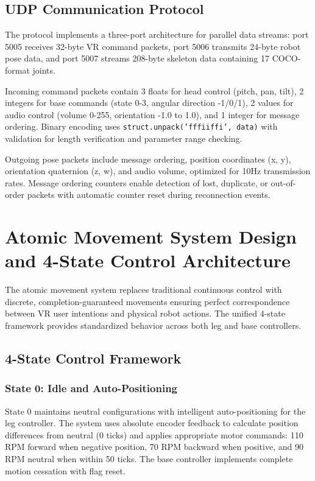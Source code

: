 \subsection{UDP Communication Protocol}

The protocol implements a three-port architecture for parallel data streams: port 5005 receives 32-byte VR command packets, port 5006 transmits 24-byte robot pose data, and port 5007 streams 208-byte skeleton data containing 17 COCO-format joints.

Incoming command packets contain 3 floats for head control (pitch, pan, tilt), 2 integers for base commands (state 0-3, angular direction -1/0/1), 2 values for audio control (volume 0-255, orientation -1.0 to 1.0), and 1 integer for message ordering. Binary encoding uses \texttt{struct.unpack('fffiiffi', data)} with validation for length verification and parameter range checking.

Outgoing pose packets include message ordering, position coordinates (x, y), orientation quaternion (z, w), and audio volume, optimized for 10Hz transmission rates. Message ordering counters enable detection of lost, duplicate, or out-of-order packets with automatic counter reset during reconnection events.

\section{Atomic Movement System Design and 4-State Control Architecture}

The atomic movement system replaces traditional continuous control with discrete, completion-guaranteed movements ensuring perfect correspondence between VR user intentions and physical robot actions. The unified 4-state framework provides standardized behavior across both leg and base controllers.

\subsection{4-State Control Framework}

\subsubsection{State 0: Idle and Auto-Positioning}

State 0 maintains neutral configurations with intelligent auto-positioning for the leg controller. The system uses absolute encoder feedback to calculate position differences from neutral (0 ticks) and applies appropriate motor commands: 110 RPM forward when negative position, 70 RPM backward when positive, and 90 RPM neutral when within 50 ticks. The base controller implements complete motion cessation with flag reset.

